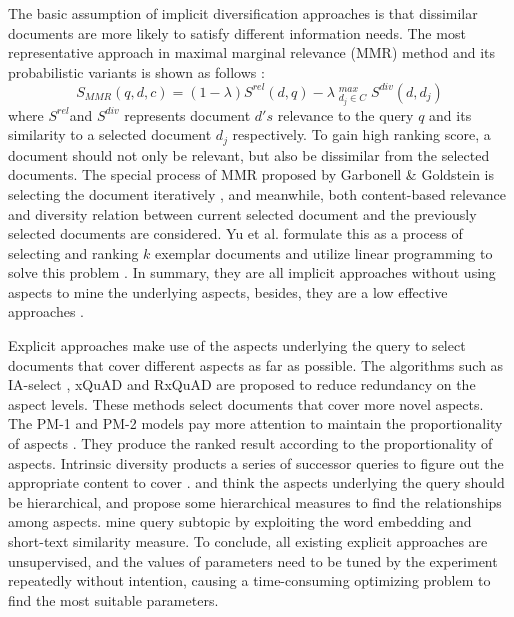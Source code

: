 \documentclass[review]{elsarticle}
\newcommand\revised[1]{{\color{black} #1}}
\begin{document}
\revised{
 The basic assumption of implicit diversification approaches is that dissimilar documents are more likely to satisfy different information needs. The most representative approach in maximal marginal relevance (MMR) method and its probabilistic variants is shown as follows \cite{zhai2003beyond}:
\begin{equation}
S_{MMR}(q,d,c) = (1-\lambda)S^{rel}(d,q) - \lambda \mathop{}_{d_j \in C}^{max}   S^{div}(d,d_{j})
\end{equation}
where $ S^{rel}  $and $ S^{div}  $ represents  document $d's$ relevance to the query $q$ and its similarity to a selected document $d_{j}$ respectively. To gain high ranking score, a document should not only be relevant, but also be dissimilar from the selected documents.
The special process of MMR proposed by Garbonell \& Goldstein is selecting the document iteratively \cite{carbonell1998use}, and meanwhile, both content-based relevance and diversity relation between current selected document and the previously selected documents are considered. Yu et al. formulate this as a process of selecting and ranking $k$ exemplar documents and utilize linear programming to solve this problem \cite{Yu:2017:CIL:3018661.3018710}.
In summary, they are all implicit approaches without using aspects to mine the underlying aspects, besides, they are a low effective approaches \cite{santos2010exploiting,drosou2010search}.


Explicit approaches make use of the aspects underlying the query to select documents that cover different aspects as far as possible. The algorithms such as IA-select \cite{agrawal2009diversifying}, xQuAD \cite{santos2010exploiting} and RxQuAD \cite{vargas2012explicit} are proposed to reduce redundancy on the aspect levels. These methods select documents that cover more novel aspects. The PM-1 and PM-2 models pay more attention to maintain the proportionality of aspects \cite{dang2012diversity}. They produce the ranked result according to the proportionality of aspects. Intrinsic diversity products a series of successor queries to figure out the appropriate content to cover \cite{raman2013toward}. \cite{Wang:2016:ESR:2911451.2911497} and \cite{Hu15searchresult} think the aspects underlying the query should be hierarchical, and propose some hierarchical measures to find the relationships among aspects. \cite{Ullah2016QuerySM} mine query subtopic by exploiting the word embedding and short-text similarity measure. 
To conclude, all existing explicit approaches are unsupervised, and the values of parameters need to be tuned by the experiment repeatedly without intention, causing a time-consuming optimizing problem to find the most suitable parameters.

}
\end{document}
